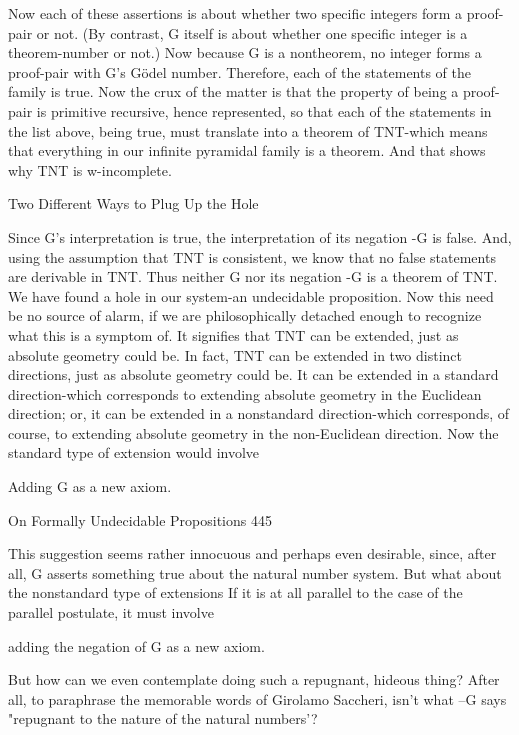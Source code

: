 Now each of these assertions is about whether two specific integers form a proof-pair or
not. (By contrast, G itself is about whether one specific integer is a theorem-number or
not.) Now because G is a nontheorem, no integer forms a proof-pair with G's Gödel
number. Therefore, each of the statements of the family is true. Now the crux of the
matter is that the property of being a proof-pair is primitive recursive, hence represented,
so that each of the statements in the list above, being true, must translate into a theorem
of TNT-which means that everything in our infinite pyramidal family is a theorem. And
that shows why TNT is w-incomplete.

                       Two Different Ways to Plug Up the Hole

Since G's interpretation is true, the interpretation of its negation -G is false. And, using
the assumption that TNT is consistent, we know that no false statements are derivable in
TNT. Thus neither G nor its negation -G is a theorem of TNT. We have found a hole in
our system-an undecidable proposition. Now this need be no source of alarm, if we are
philosophically detached enough to recognize what this is a symptom of. It signifies that
TNT can be extended, just as absolute geometry could be. In fact, TNT can be extended
in two distinct directions, just as absolute geometry could be. It can be extended in a
standard direction-which corresponds to extending absolute geometry in the Euclidean
direction; or, it can be extended in a nonstandard direction-which corresponds, of course,
to extending absolute geometry in the non-Euclidean direction. Now the standard type of
extension would involve

                                Adding G as a new axiom.




On Formally Undecidable Propositions                                                    445

This suggestion seems rather innocuous and perhaps even desirable, since, after all, G
asserts something true about the natural number system. But what about the nonstandard
type of extensions If it is at all parallel to the case of the parallel postulate, it must
involve

                        adding the negation of G as a new axiom.

But how can we even contemplate doing such a repugnant, hideous thing? After all, to
paraphrase the memorable words of Girolamo Saccheri, isn't what --G says "repugnant to
the nature of the natural numbers'?

